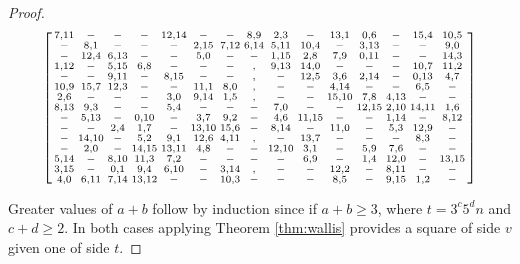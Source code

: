 \begin{proof}
\begin{equation}
  \begin{bsmallmatrix}
    7,11 &   -   &   -   &   -   & 12,14 &   -   &   -   &  8,9  &  2,3  &   -   & 13,1  &  0,6  &   -   & 15,4  & 10,5  \\ 
     -   &  8,1  &   -   &   -   &   -   &  2,15 &  7,12 &  6,14 &  5,11 & 10,4  &   -   &  3,13 &   -   &   -   &  9,0  \\ 
     -   & 12,4  &  6,13 &   -   &   -   &  5,0  &   -   &   -   &  1,15 &  2,8  &  7,9  &  0,11 &   -   &   -   & 14,3  \\ 
    1,12 &   -   &  5,15 &  6,8  &   -   &   -   &   -   &   ,   &  9,13 & 14,0  &   -   &   -   &   -   & 10,7  & 11,2  \\ 
     -   &   -   &  9,11 &   -   &  8,15 &   -   &   -   &   ,   &   -   & 12,5  &  3,6  &  2,14 &   -   &  0,13 &  4,7  \\ 
   10,9  & 15,7  & 12,3  &   -   &   -   & 11,1  &  8,0  &   ,   &   -   &   -   &  4,14 &   -   &   -   &  6,5  &   -   \\ 
    2,6  &   -   &   -   &   -   &  3,0  &  9,14 &  1,5  &   ,   &   -   &   -   & 15,10 &  7,8  &  4,13 &   -   &   -   \\ 
    8,13 &  9,3  &   -   &   -   &  5,4  &   -   &   -   &   -   &  7,0  &   -   &   -   & 12,15 &  2,10 & 14,11 &  1,6  \\ 
     -   &  5,13 &   -   &  0,10 &   -   &  3,7  &  9,2  &   -   &  4,6  & 11,15 &   -   &   -   &  1,14 &   -   &  8,12 \\ 
     -   &   -   &  2,4  &  1,7  &   -   & 13,10 & 15,6  &   -   &  8,14 &   -   & 11,0  &   -   &  5,3  & 12,9  &   -   \\ 
     -   & 14,10 &   -   &  5,2  &  9,1  & 12,6  &  4,11 &   ,   &   -   & 13,7  &   -   &   -   &   -   &  8,3  &   -   \\ 
     -   &  2,0  &   -   & 14,15 & 13,11 &  4,8  &   -   &   -   & 12,10 &  3,1  &   -   &  5,9  &  7,6  &   -   &   -   \\ 
    5,14 &   -   &  8,10 & 11,3  &  7,2  &   -   &   -   &   -   &   -   &  6,9  &   -   &  1,4  & 12,0  &   -   & 13,15 \\ 
    3,15 &   -   &  0,1  &  9,4  &  6,10 &   -   &  3,14 &   ,   &   -   &   -   & 12,2  &   -   &  8,11 &   -   &   -   \\ 
    4,0  &  6,11 &  7,14 & 13,12 &   -   &   -   & 10,3  &   -   &   -   &   -   &  8,5  &   -   &  9,15 &  1,2  &   -   \\ 
  \end{bsmallmatrix}
  \label{eq:order-sixteen}
\end{equation}

Greater values of $a + b$ follow by induction since if $a + b \geq 3$, where $t = 3^{c}5^{d}n$ and $c + d \geq 2$.
In both cases applying Theorem \ref{thm:wallis} provides a square of side $v$ given one of side $t$.
\end{proof}
